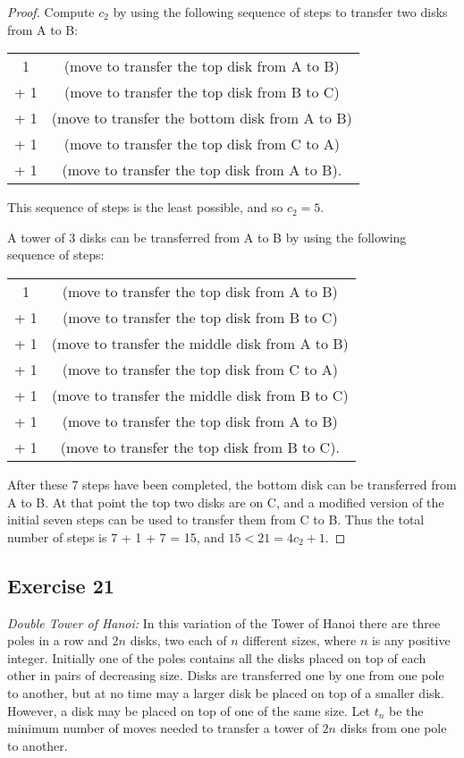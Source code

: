 \documentclass[14pt]{extarticle}
\begin{document}
\begin{proof}
    Compute $c_2$ by using the following sequence of steps to transfer two disks from A to B:

    \begin{tabular}{cc}
        1   & (move to transfer the top disk from A to B)    \\
        + 1 & (move to transfer the top disk from B to C)    \\
        + 1 & (move to transfer the bottom disk from A to B) \\
        + 1 & (move to transfer the top disk from C to A)    \\
        + 1 & (move to transfer the top disk from A to B).
    \end{tabular}

    This sequence of steps is the least possible, and so $c_2 = 5$.

    A tower of 3 disks can be transferred from A to B by using the following sequence of steps:

    \begin{tabular}{cc}
        1   & (move to transfer the top disk from A to B)    \\
        + 1 & (move to transfer the top disk from B to C)    \\
        + 1 & (move to transfer the middle disk from A to B) \\
        + 1 & (move to transfer the top disk from C to A)    \\
        + 1 & (move to transfer the middle disk from B to C) \\
        + 1 & (move to transfer the top disk from A to B)    \\
        + 1 & (move to transfer the top disk from B to C).
    \end{tabular}

    After these 7 steps have been completed, the bottom disk can be transferred from A to B. At that point the top two
    disks are on C, and a modified version of the initial seven steps can be used to transfer them from C to B. Thus the
    total number of steps is 7 + 1 + 7 = 15, and $15 < 21 = 4c_2 + 1$.
\end{proof}

\subsection{Exercise 21}
{\it Double Tower of Hanoi:} In this variation of the Tower of Hanoi there are three poles in a row and $2n$ disks, two
each of $n$ different sizes, where $n$ is any positive integer. Initially one of the poles contains all the disks
placed on top of each other in pairs of decreasing size. Disks are transferred one by one from one pole to another,
but at no time may a larger disk be placed on top of a smaller disk. However, a disk may be placed on top of one
of the same size. Let $t_n$ be the minimum number of moves needed to transfer a tower of $2n$ disks from one pole to another.
\end{document}
